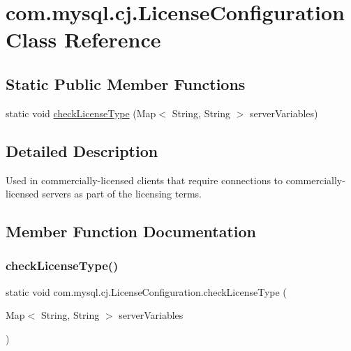 \hypertarget{classcom_1_1mysql_1_1cj_1_1_license_configuration}{}\section{com.\+mysql.\+cj.\+License\+Configuration Class Reference}
\label{classcom_1_1mysql_1_1cj_1_1_license_configuration}
\subsection*{Static Public Member Functions}
\begin{DoxyCompactItemize}
\item 
static void \mbox{\hyperlink{classcom_1_1mysql_1_1cj_1_1_license_configuration_a44903a0cadc3621b21f140406480bf34}{check\+License\+Type}} (Map$<$ String, String $>$ server\+Variables)
\end{DoxyCompactItemize}


\subsection{Detailed Description}
Used in commercially-\/licensed clients that require connections to commercially-\/licensed servers as part of the licensing terms. 

\subsection{Member Function Documentation}
\mbox{\label{classcom_1_1mysql_1_1cj_1_1_license_configuration_a44903a0cadc3621b21f140406480bf34}} 
\subsubsection{\texorpdfstring{check\+License\+Type()}{checkLicenseType()}}
{\footnotesize\ttfamily static void com.\+mysql.\+cj.\+License\+Configuration.\+check\+License\+Type (\begin{DoxyParamCaption}\item[{Map$<$ String, String $>$}]{server\+Variables }\end{DoxyParamCaption})\hspace{0.3cm}{\ttfamily [static]}}


